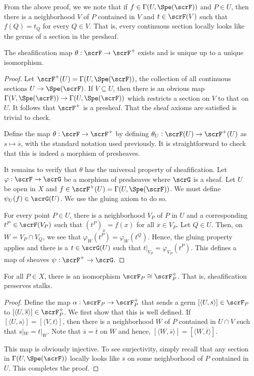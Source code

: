 \begin{remark}
    From the above proof, we we note that if $f\in\Gamma(U, \Spe(\scrF))$ and $P\in U$, then there is a neighborhood $V$ of $P$ contained in $V$ and $t\in\scrF(V)$ such that $f(Q) = t_Q$ for every $Q\in V$. That is, every continuous section locally looks like the germs of a section in the presheaf.
\end{remark}

\begin{proposition}
    The sheafification map $\theta:\scrF\to\scrF^+$ exists and is unique up to a unique isomorphism.
\end{proposition}
\begin{proof}
    Let $\scrF^+(U) = \Gamma(U, \Spe(\scrF))$, the collection of all continuous sections $U\to\Spe(\scrF)$. If $V\subseteq U$, then there is an obvious map $\Gamma(V,\Spe(\scrF))\to\Gamma(U,\Spe(\scrF))$ which restricts a section on $V$ to that on $U$. It follows that $\scrF^+$ is a presheaf. That the sheaf axioms are satisfied is trivial to check.

    Define the map $\theta:\scrF\to\scrF^+$ by defining $\theta_U: \scrF(U)\to\scrF^+(U)$ as $s\mapsto\overline s$, with the standard notation used previously. It is straightforward to check that this is indeed a morphism of presheaves. 

    It remains to verify that $\theta$ has the universal property of sheafification. Let $\varphi:\scrF\to\scrG$ be a morphism of presheaves where $\scrG$ is a sheaf. Let $U$ be open in $X$ and $f\in\scrF^+(U) = \Gamma(U,\Spe(\scrF))$. We must define $\psi_U(f)\in\scrG(U)$. We use the gluing axiom to do so.

    For every point $P\in U$, there is a neighborhood $V_P$ of $P$ in $U$ and a corresponding $t^P\in\scrF(V_P)$ such that $(t^P)_{x} = f(x)$ for all $x\in V_P$. Let $Q\in U$. Then, on $W = V_P\cap V_Q$, we see that $\varphi_W(t^P) = \varphi_W(t^Q)$. Hence, the gluing property applies and there is a $t\in\scrG(U)$ such that $t|_{V_P} = \varphi_{V_P}(t^P)$. This defines a map of sheaves $\psi:\scrF^+\to\scrG$.
\end{proof}

\begin{proposition}
    For all $P\in X$, there is an isomorphism $\scrF_P\cong\scrF^+_P$. That is, sheafification preserves stalks.
\end{proposition}
\begin{proof}
    Define the map $\alpha:\scrF_P\to\scrF^+_P$ that sends a germ $[\langle U, s\rangle]\in\scrF_P$ to $[\langle U, \overline s\rangle]\in\scrF^+_P$. We first show that this is well defined. If $[\langle U, s\rangle] = [\langle V, t\rangle]$, then there is a neighborhood $W$ of $P$ contained in $U\cap V$ such that $s|_W = t|_W$. Note that $\overline s = \overline t$ on $W$ and hence, $[\langle W, \overline s\rangle] = [\langle W, \overline t\rangle]$.

    This map is obviously injective. To see surjectivity, simply recall that any section in $\Gamma(U,\Spe(\scrF))$ locally looks like $\overline s$ on some neighborhood of $P$ contained in $U$. This completes the proof.
\end{proof}

